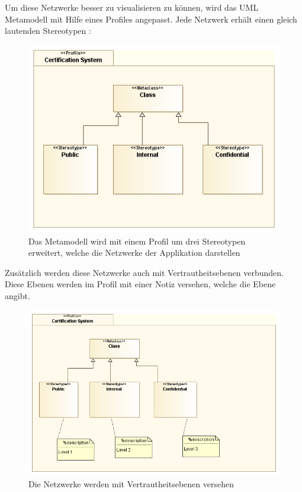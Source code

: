 Um diese Netzwerke besser zu visualisieren zu können, wird das UML Metamodell mit Hilfe eines Profiles angepasst. Jede Netzwerk erhält einen gleich lautenden Stereotypen \cite[S. 518]{glasklar}:

\begin{figure}[H]
    \centering
    \includegraphics[scale=0.5]{uml/datastereotypes.png}
    \caption{Das Metamodell wird mit einem Profil um drei Stereotypen erweitert, welche die Netzwerke der Applikation darstellen}
\end{figure}

Zusätzlich werden diese Netzwerke auch mit Vertrautheitsebenen verbunden. Diese Ebenen werden im Profil mit einer Notiz versehen, welche die Ebene angibt.

\begin{figure}[H]
    \centering
    \includegraphics[scale=0.5]{uml/datastereotypeslevel.png}
    \caption{Die Netzwerke werden mit Vertrautheitsebenen versehen}
\end{figure}

